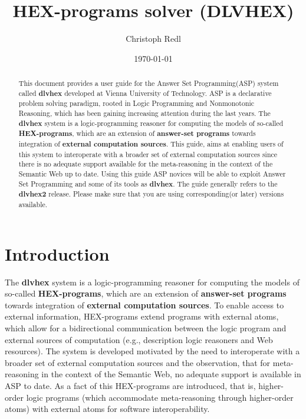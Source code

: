 \documentclass[14pt,a4paper, titlepage]{article}
\begin{document}
\setcounter{page}{3}
\title{HEX-programs solver (DLVHEX)}
\author{Christoph Redl}
\date{\today}
\maketitle


\begin{abstract}
This document provides a user guide for the Answer Set Programming(ASP) system called \textbf{dlvhex} developed at Vienna University of Technology. ASP is a declarative problem solving paradigm, rooted in Logic Programming and Nonmonotonic Reasoning, which has been gaining increasing attention during the last years. The \textbf{dlvhex} system is a logic-programming reasoner for computing the models of so-called \textbf{HEX-programs}, which are an extension of \textbf{answer-set programs} towards integration of \textbf{external computation sources}. This guide, aims at enabling users of this system to interoperate with a broader set of external computation sources since there is no adequate support available for the meta-reasoning in the context of the Semantic Web up to date. Using this guide ASP novices will be able to exploit Answer Set Programming and some of its tools as \textbf{dlvhex}. The guide generally refers to the \textbf{dlvhex2} release. Please make sure that you are using corresponding(or later) versions available.     
\end{abstract}


\tableofcontents

\newpage

\section{Introduction} %
The \textbf{dlvhex} system is a logic-programming reasoner for computing the models of so-called \textbf{HEX-programs}, which are an extension of \textbf{answer-set programs} towards integration of \textbf{external computation sources}. To enable access to external information, HEX-programs extend programs with external atoms, which allow for a bidirectional communication between the logic program and external sources of computation (e.g., description logic reasoners and Web resources). \cite{extatoms} The system is developed motivated by the need to interoperate with a broader set of external computation sources and the observation, that for meta-reasoning in the context of the Semantic Web, no adequate support is available in ASP to date. As a fact of this HEX-programs are introduced, that is, higher-order logic programs (which accommodate meta-reasoning through higher-order atoms) with external atoms for software interoperability.
\end{document}
